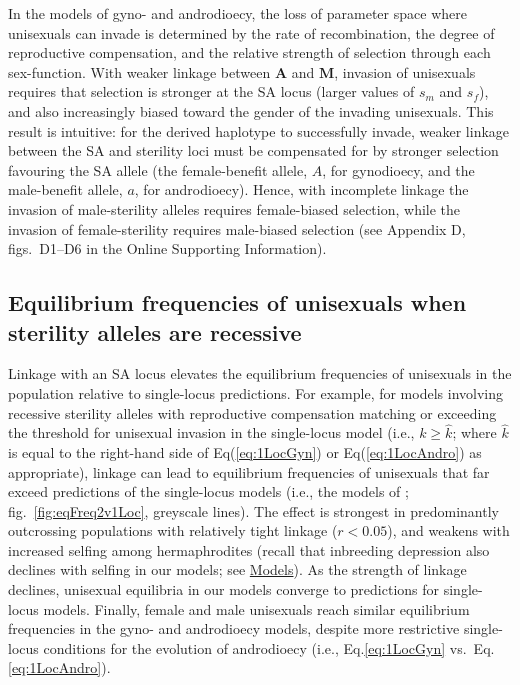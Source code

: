 \documentclass{article}
\begin{document}
In the models of gyno- and androdioecy, the loss of parameter space where unisexuals can invade is determined by the rate of recombination, the degree of reproductive compensation, and the relative strength of selection through each sex-function. With weaker linkage between $\mathbf{A}$ and $\mathbf{M}$, invasion of unisexuals requires that selection is stronger at the SA locus (larger values of $s_m$ and $s_f$), and also increasingly biased toward the gender of the invading unisexuals. This result is intuitive: for the derived haplotype to successfully invade, weaker linkage between the SA and sterility loci must be compensated for by stronger selection favouring the SA allele (the female-benefit allele, $A$, for gynodioecy, and the male-benefit allele, $a$, for androdioecy). Hence, with incomplete linkage the invasion of male-sterility alleles requires female-biased selection, while the invasion of female-sterility requires male-biased selection (see Appendix D, figs.~D1--D6 in the Online Supporting Information). 

\subsection*{Equilibrium frequencies of unisexuals when sterility alleles are recessive}

Linkage with an SA locus elevates the equilibrium frequencies of unisexuals in the population relative to single-locus predictions. For example, for models involving recessive sterility alleles with reproductive compensation matching or exceeding the threshold for unisexual invasion in the single-locus model (i.e., $k \geq \hat{k}$; where $\hat{k}$ is equal to the right-hand side of Eq(\ref{eq:1LocGyn}) or Eq(\ref{eq:1LocAndro}) as appropriate), linkage can lead to equilibrium frequencies of unisexuals that far exceed predictions of the single-locus models (i.e., the models of \citealt{Charlesworth1978a}; fig.~\ref{fig:eqFreq2v1Loc}, greyscale lines). The effect is strongest in predominantly outcrossing populations with relatively tight linkage ($r < 0.05$), and weakens with increased selfing among hermaphrodites (recall that inbreeding depression also declines with selfing in our models; see \hyperref[sec:Models]{Models}). As the strength of linkage declines, unisexual equilibria in our models converge to predictions for single-locus models. Finally, female and male unisexuals reach similar equilibrium frequencies in the gyno- and androdioecy models, despite more restrictive single-locus conditions for the evolution of androdioecy (i.e., Eq.\ref{eq:1LocGyn} vs.~Eq.\ref{eq:1LocAndro}).
\end{document}
